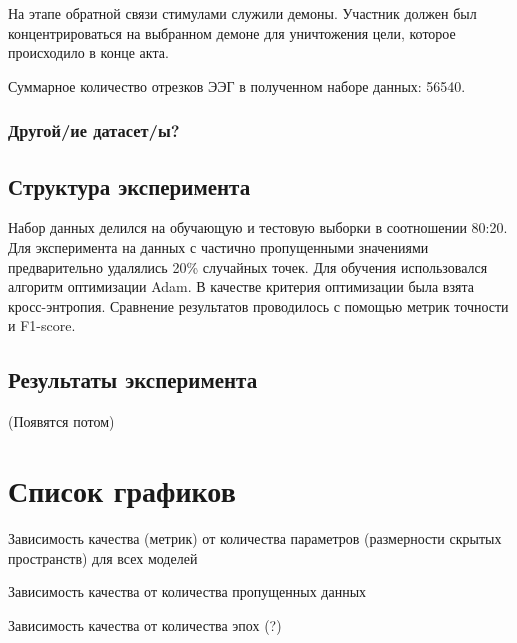 \documentclass{article}
\begin{document}
На этапе обратной связи стимулами служили демоны. Участник должен был концентрироваться на выбранном демоне для уничтожения цели, которое происходило в конце акта.

Суммарное количество отрезков ЭЭГ в полученном наборе данных: 56540.

\subsubsection{Другой/ие датасет/ы?}

\subsection{Структура эксперимента}

Набор данных делился на обучающую и тестовую выборки в соотношении 80:20. Для эксперимента на данных с частично пропущенными значениями предварительно удалялись 20\% случайных точек. Для обучения использовался алгоритм оптимизации Adam. В качестве критерия оптимизации была взята кросс-энтропия. Сравнение результатов проводилось с помощью метрик точности и F1-score. 

\subsection{Результаты эксперимента}

(Появятся потом)


\section{Список графиков}

Зависимость качества (метрик) от количества параметров (размерности скрытых пространств) для всех моделей

Зависимость качества от количества пропущенных данных

Зависимость качества от количества эпох (?)









\end{document}
